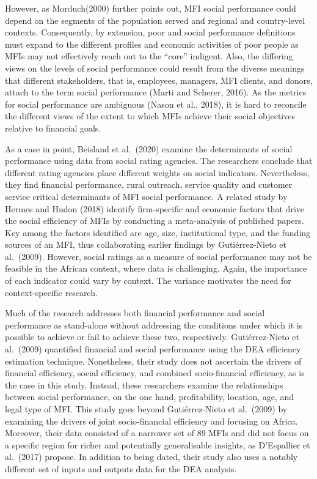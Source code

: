 \documentclass[
]{article}
\begin{document}
However, as Morduch(2000) further points out, MFI social performance
could depend on the segments of the population served and regional and
country-level contexts. Consequently, by extension, poor and social
performance definitions must expand to the different profiles and
economic activities of poor people as MFIs may not effectively reach out
to the ``core'' indigent. Also, the differing views on the levels of
social performance could result from the diverse meanings that different
stakeholders, that is, employees, managers, MFI clients, and donors,
attach to the term social performance (Marti and Scherer, 2016). As the
metrics for social performance are ambiguous (Nason et al., 2018), it is
hard to reconcile the different views of the extent to which MFIs
achieve their social objectives relative to financial goals.

As a case in point, Beisland et al.~(2020) examine the determinants of
social performance using data from social rating agencies. The
researchers conclude that different rating agencies place different
weights on social indicators. Nevertheless, they find financial
performance, rural outreach, service quality and customer service
critical determinants of MFI social performance. A related study by
Hermes and Hudon (2018) identify firm-specific and economic factors that
drive the social efficiency of MFIs by conducting a meta-analysis of
published papers. Key among the factors identified are age, size,
institutional type, and the funding sources of an MFI, thus
collaborating earlier findings by Gutiérrez-Nieto et al.~(2009).
However, social ratings as a measure of social performance may not be
feasible in the African context, where data is challenging. Again, the
importance of each indicator could vary by context. The variance
motivates the need for context-specific research.

Much of the research addresses both financial performance and social
performance as stand-alone without addressing the conditions under which
it is possible to achieve or fail to achieve these two, respectively.
Gutiérrez-Nieto et al.~(2009) quantified financial and social
performance using the DEA efficiency estimation technique. Nonetheless,
their study does not ascertain the drivers of financial efficiency,
social efficiency, and combined socio-financial efficiency, as is the
case in this study. Instead, these researchers examine the relationships
between social performance, on the one hand, profitability, location,
age, and legal type of MFI. This study goes beyond Gutiérrez-Nieto et
al.~(2009) by examining the drivers of joint socio-financial efficiency
and focusing on Africa. Moreover, their data consisted of a narrower set
of 89 MFIs and did not focus on a specific region for richer and
potentially generalisable insights, as D'Espallier et al.~(2017)
propose. In addition to being dated, their study also uses a notably
different set of inputs and outputs data for the DEA analysis.
\end{document}
